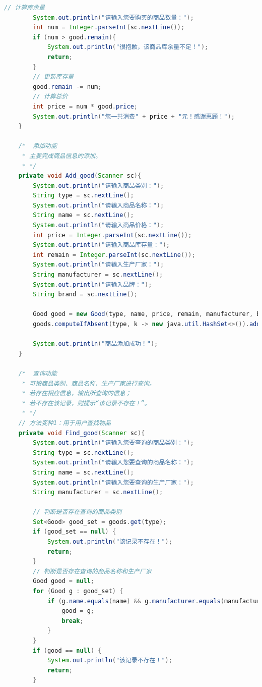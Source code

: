 \documentclass[12pt, a4paper, oneside]{ctexart}
\begin{document}
\begin{lstlisting}[language=Java, breaklines=true]
        // 计算库余量
        System.out.println("请输入您要购买的商品数量：");
        int num = Integer.parseInt(sc.nextLine());
        if (num > good.remain){
            System.out.println("很抱歉，该商品库余量不足！");
            return;
        }
        // 更新库存量
        good.remain -= num;
        // 计算总价
        int price = num * good.price;
        System.out.println("您一共消费" + price + "元！感谢惠顾！");
    }

    /*  添加功能
     * 主要完成商品信息的添加。
     * */
    private void Add_good(Scanner sc){
        System.out.println("请输入商品类别：");
        String type = sc.nextLine();
        System.out.println("请输入商品名称：");
        String name = sc.nextLine();
        System.out.println("请输入商品价格：");
        int price = Integer.parseInt(sc.nextLine());
        System.out.println("请输入商品库存量：");
        int remain = Integer.parseInt(sc.nextLine());
        System.out.println("请输入生产厂家：");
        String manufacturer = sc.nextLine();
        System.out.println("请输入品牌：");
        String brand = sc.nextLine();

        Good good = new Good(type, name, price, remain, manufacturer, brand);
        goods.computeIfAbsent(type, k -> new java.util.HashSet<>()).add(good);

        System.out.println("商品添加成功！");
    }

    /*  查询功能
     * 可按商品类别、商品名称、生产厂家进行查询。
     * 若存在相应信息，输出所查询的信息；
     * 若不存在该记录，则提示“该记录不存在！”。
     * */
    // 方法变种1：用于用户查找物品
    private void Find_good(Scanner sc){
        System.out.println("请输入您要查询的商品类别：");
        String type = sc.nextLine();
        System.out.println("请输入您要查询的商品名称：");
        String name = sc.nextLine();
        System.out.println("请输入您要查询的生产厂家：");
        String manufacturer = sc.nextLine();

        // 判断是否存在查询的商品类别
        Set<Good> good_set = goods.get(type);
        if (good_set == null) {
            System.out.println("该记录不存在！");
            return;
        }
        // 判断是否存在查询的商品名称和生产厂家
        Good good = null;
        for (Good g : good_set) {
            if (g.name.equals(name) && g.manufacturer.equals(manufacturer)) {
                good = g;
                break;
            }
        }
        if (good == null) {
            System.out.println("该记录不存在！");
            return;
        }


\end{lstlisting}
\end{document}
